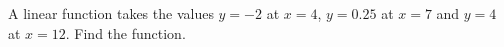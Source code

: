 A linear function takes the values $y=-2$ at $x=4$, $y=0.25$ at $x=7$ and $y=4$ at $x=12$. Find the function.
